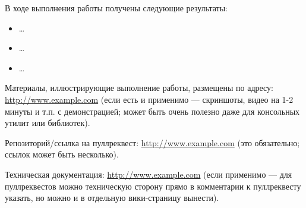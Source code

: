 \documentclass[a4paper]{article}
\begin{document}
В ходе выполнения работы получены следующие результаты:


\begin{itemize}
    \item \dots
    \item \dots
    \item \dots
\end{itemize}

Материалы, иллюстрирующие выполнение работы, размещены по адресу: \url{http://www.example.com} (если есть и применимо --- скриншоты, видео на 1-2 минуты и т.п. с демонстрацией; может быть очень полезно даже для консольных утилит или библиотек).

Репозиторий/ссылка на пуллреквест: \url{http://www.example.com} (это обязательно; ссылок может быть несколько).

Техническая документация: \url{http://www.example.com} (если применимо --- для пуллреквестов можно техническую сторону прямо в комментарии к пуллреквесту указать, но можно и в отдельную вики-страницу вынести).
\end{document}
